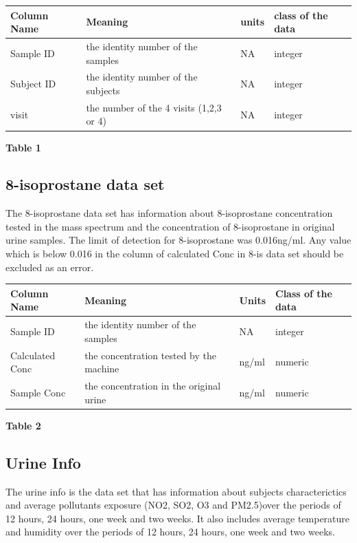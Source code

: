 \documentclass[12pt,]{article}
\begin{document}
\begin{longtable}[]{@{}llll@{}}
\toprule
Column Name & Meaning & units & class of the data\tabularnewline
\midrule
\endhead
Sample ID & the identity number of the samples & NA &
integer\tabularnewline
Subject ID & the identity number of the subjects & NA &
integer\tabularnewline
visit & the number of the 4 visits (1,2,3 or 4) & NA &
integer\tabularnewline
\bottomrule
\end{longtable}

\center \textbf{Table 1} \center 

\hypertarget{isoprostane-data-set}{%
\subsection{8-isoprostane data set}\label{isoprostane-data-set}}

The 8-isoprostane data set has information about 8-isoprostane
concentration tested in the mass spectrum and the concentration of
8-isoprostane in original urine samples. The limit of detection for
8-isoprostane was 0.016ng/ml. Any value which is below 0.016 in the
column of calculated Conc in 8-is data set should be excluded as an
error.

\begin{longtable}[]{@{}llll@{}}
\toprule
Column Name & Meaning & Units & Class of the data\tabularnewline
\midrule
\endhead
Sample ID & the identity number of the samples & NA &
integer\tabularnewline
Calculated Conc & the concentration tested by the machine & ng/ml &
numeric\tabularnewline
Sample Conc & the concentration in the original urine & ng/ml &
numeric\tabularnewline
\bottomrule
\end{longtable}

\center \textbf{Table 2} \center 

\hypertarget{urine-info}{%
\subsection{Urine Info}\label{urine-info}}

The urine info is the data set that has information about subjects
characterictics and average pollutants exposure (NO2, SO2, O3 and
PM2.5)over the periods of 12 hours, 24 hours, one week and two weeks. It
also includes average temperature and humidity over the periods of 12
hours, 24 hours, one week and two weeks.
\end{document}
